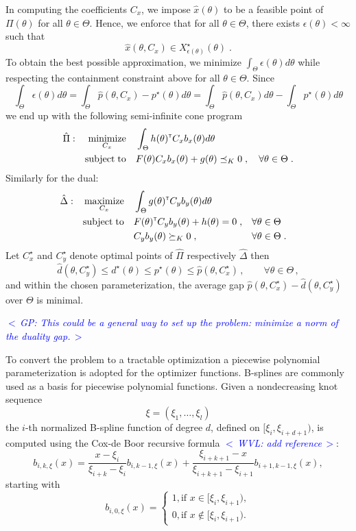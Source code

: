 \documentclass{article}
\renewcommand{\t}{^{\mbox{\tiny \sf T}}}    %
\newcommand{\ppar}{\theta}                  %
\newcommand{\Ppar}{\Theta}                  %
\DeclareMathOperator*{\minimize}{minimize}
\DeclareMathOperator*{\maximize}{maximize}
\DeclareMathOperator*{\subj}{subject\;to}
\newcommand{\commentGP}[1]{\noindent \textcolor{blue}{\emph{$<\,$GP: #1$\,>$}}}%
\newcommand{\commentWVL}[1]{\noindent \textcolor{blue}{\emph{$<\,$WVL: #1$\,>$}}}%
\begin{document}
In computing the coefficients $C_x$, we impose $\hat{x}(\ppar)$ to be a feasible point of $\Pi(\ppar)$ for all $\ppar\in\Ppar$. Hence, we enforce that for all $\ppar\in\Ppar$, there exists $\epsilon(\ppar)<\infty$ such that
\[ \hat{x}(\ppar, C_x) \in X^\star_{\epsilon(\ppar)}(\ppar) \;.
\]
To obtain the best possible approximation, we minimize $\int_{\Ppar}\epsilon(\ppar)d\ppar$ while respecting the containment constraint above for all $\ppar\in\Ppar$. Since
\[ \int_{\Ppar}\epsilon(\ppar)d\ppar = \int_{\Ppar}\hat{p}(\ppar, C_x)-p^\star(\ppar)d\ppar = \int_{\Ppar}\hat{p}(\ppar,C_x)d\ppar-\int_{\Ppar}p^\star(\ppar)d\ppar%
\]
we end up with the following semi-infinite cone program
\begin{gather}\label{eq:semi-inf_primal}
\begin{aligned}
\hat{\Pi}: && \minimize_{C_x} &&& \int_{\Ppar} h(\ppar)\t  C_x b_x(\ppar) d\ppar\\%
           && \subj           &&& F(\ppar) C_x b_x(\ppar)+g(\ppar)\preceq_K 0 \;, \quad\forall\ppar\in\Ppar\;.%
\end{aligned}
\end{gather}
Similarly for the dual:
\begin{gather}\label{eq:semi-inf_dual}
\begin{aligned}
\hat{\Delta}: && \maximize_{C_x} &&& \int_{\Ppar} g(\ppar)\t  C_y b_y(\ppar) d\ppar\\%
              && \subj           &&& F(\ppar)\t  C_y b_y(\ppar) + h(\ppar)= 0 \;, &&\forall\ppar\in\Ppar\\%
              &&                 &&&  C_y b_y(\ppar)\succeq_K 0  \;, &&\forall\ppar\in\Ppar\;.%
\end{aligned}
\end{gather}
Let $C_x^\star$ and $C_y^\star$ denote optimal points of $\hat{\Pi}$ respectively $\hat{\Delta}$ then
\[ \hat{d}(\ppar,C_y^\star) \leq d^\star(\ppar) \leq p^\star(\ppar) \leq \hat{p}(\ppar,C_x^\star)\,,\qquad\forall\ppar\in\Ppar\,,%
\]
and within the chosen parameterization, the average gap $\hat{p}(\ppar,C_x^\star)-\hat{d}(\ppar,C_y^\star)$ over $\Ppar$ is minimal.

\commentGP{This could be a general way to set up the problem: minimize a norm of the duality gap.}

To convert the problem to a tractable optimization a piecewise polynomial
parameterization is adopted for the optimizer functions. B-splines are
commonly used as a basis for piecewise polynomial functions. Given a
nondecreasing knot sequence
\[
\xi = (\xi_1, \ldots, \xi_l)
\]
the $i$-th normalized B-spline function of degree $d$, defined on $[\xi_i,
\xi_{i+d+1})$, is computed using the Cox-de Boor recursive formula
\commentWVL{add reference}:
\[
    b_{i,k,\xi}(x) = \frac{x-\xi_i}{\xi_{i+k} - \xi_i}
    b_{i,k-1,\xi}(x) +
    \frac{\xi_{i+k+1}-x}{\xi_{i+k+1} - \xi_{i+1}}
    b_{i+1,k-1,\xi}(x) ,
\]
starting with
\[
    b_{i,0,\xi}(x)  = 
    \begin{cases}
        1 , \text{if } x \in [\xi_i , \xi_{i+1} ) , \\
        0, \text{if } x \notin [\xi_i , \xi_{i+1} ) . 
    \end{cases}
\]
\end{document}
